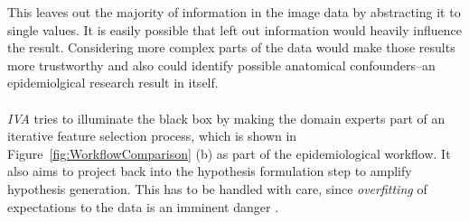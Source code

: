 \documentclass[journal]{style/vgtc} 			          %
\begin{document}
%
This leaves out the majority of information in the image data by abstracting it to single values.
%
It is easily possible that left out information would heavily influence the result.
%
Considering more complex parts of the data would make those results more trustworthy and also could identify possible anatomical confounders--an epidemiolgical research result in itself.
\\\\
\emph{IVA} tries to illuminate the black box by making the domain experts part of an iterative feature selection process, which is shown in Figure~\ref{fig:WorkflowComparison} (b) as part of the epidemiological workflow.
%
%
It also aims to project back into the hypothesis formulation step to amplify hypothesis generation.
%
This has to be handled with care, since \emph{overfitting} of expectations to the data is an imminent danger \cite{Turkay2013}.
\end{document}
